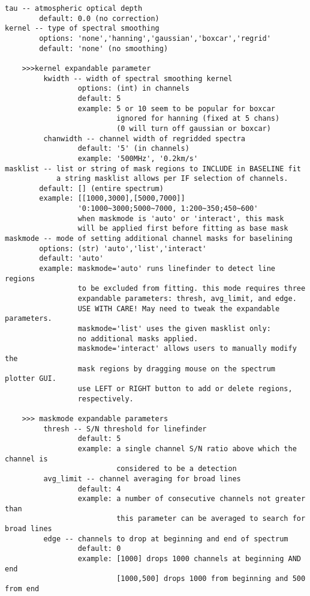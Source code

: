 \begin{verbatim}
tau -- atmospheric optical depth
        default: 0.0 (no correction)
kernel -- type of spectral smoothing
        options: 'none','hanning','gaussian','boxcar','regrid'
        default: 'none' (no smoothing)

    >>>kernel expandable parameter
         kwidth -- width of spectral smoothing kernel
                 options: (int) in channels
                 default: 5
                 example: 5 or 10 seem to be popular for boxcar
                          ignored for hanning (fixed at 5 chans)
                          (0 will turn off gaussian or boxcar)
         chanwidth -- channel width of regridded spectra
                 default: '5' (in channels)
                 example: '500MHz', '0.2km/s'
masklist -- list or string of mask regions to INCLUDE in BASELINE fit
            a string masklist allows per IF selection of channels.
        default: [] (entire spectrum)
        example: [[1000,3000],[5000,7000]]
                 '0:1000~3000;5000~7000, 1:200~350;450~600'
                 when maskmode is 'auto' or 'interact', this mask 
                 will be applied first before fitting as base mask
maskmode -- mode of setting additional channel masks for baselining
        options: (str) 'auto','list','interact'
        default: 'auto'
        example: maskmode='auto' runs linefinder to detect line regions 
                 to be excluded from fitting. this mode requires three 
                 expandable parameters: thresh, avg_limit, and edge.
                 USE WITH CARE! May need to tweak the expandable parameters.
                 maskmode='list' uses the given masklist only: 
                 no additional masks applied.
                 maskmode='interact' allows users to manually modify the 
                 mask regions by dragging mouse on the spectrum plotter GUI.
                 use LEFT or RIGHT button to add or delete regions, 
                 respectively.

    >>> maskmode expandable parameters
         thresh -- S/N threshold for linefinder
                 default: 5
                 example: a single channel S/N ratio above which the channel is
                          considered to be a detection
         avg_limit -- channel averaging for broad lines
                 default: 4
                 example: a number of consecutive channels not greater than
                          this parameter can be averaged to search for broad lines
         edge -- channels to drop at beginning and end of spectrum
                 default: 0
                 example: [1000] drops 1000 channels at beginning AND end
                          [1000,500] drops 1000 from beginning and 500 from end


\end{verbatim}
